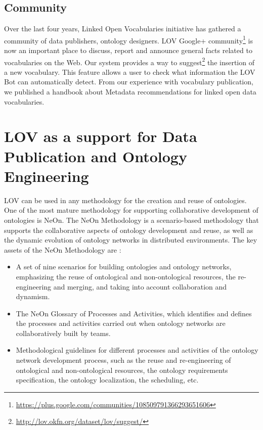 \documentclass{iosart2c}
\begin{document}
	\subsection{Community}
	Over the last four years, Linked Open Vocabularies initiative has gathered a community of data publishers, ontology designers. LOV Google+ community\footnote{\url{https://plus.google.com/communities/108509791366293651606}} is now an important place to discuss, report and announce general facts related to vocabularies on the Web. Our system provides a way to suggest\footnote{\url{http://lov.okfn.org/dataset/lov/suggest/}} the insertion of a new vocabulary. This feature allows a user to check what information the LOV Bot can automatically detect. From our experience with vocabulary publication, we published a handbook about Metadata recommendations for linked open data vocabularies\cite{vandenbussche2011metadata}.


\section{LOV as a support for Data Publication and Ontology Engineering}
\label{sec:dataPubOntoEngine}


LOV can be used in any methodology for the creation and reuse of ontologies. One of the most mature methodology for supporting collaborative development of ontologies is NeOn.  
The NeOn Methodology is a scenario-based methodology that supports the collaborative aspects of ontology development and reuse, as well as the dynamic evolution of ontology networks in distributed environments. The key assets of the NeOn Methodology are \cite{MC10}:
\begin{itemize}
 \item  A set of nine scenarios for building ontologies and ontology networks, emphasizing the reuse of ontological and non-ontological resources, the re-engineering and merging, and taking into account collaboration and dynamism.
 \item The NeOn Glossary of Processes and Activities, which identifies and defines the processes and activities carried out when ontology networks are collaboratively built by teams.
 \item Methodological guidelines for different processes and activities of the ontology network development process, such as the reuse and re-engineering of ontological and non-ontological resources, the ontology requirements specification, the ontology localization, the scheduling, etc.
\end{itemize}
\end{document}
